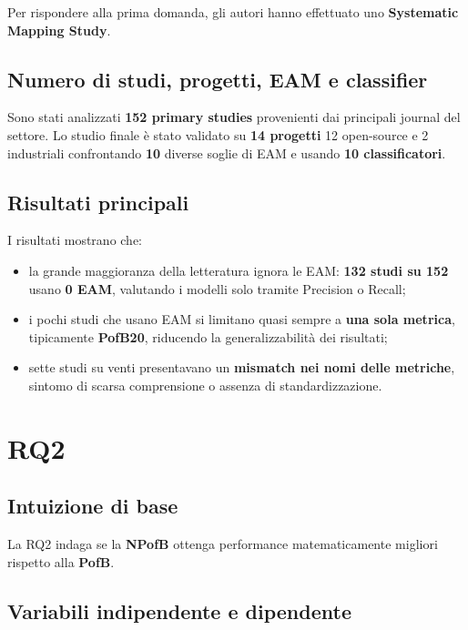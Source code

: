 Per rispondere alla prima domanda, gli autori hanno effettuato uno \textbf{Systematic Mapping Study}.

\subsection{Numero di studi, progetti, EAM e classifier}

Sono stati analizzati \textbf{152 primary studies} provenienti dai principali journal del settore. Lo studio finale è stato validato su \textbf{14 progetti} \textemdash{} 12 open-source e 2 industriali \textemdash{} confrontando \textbf{10} diverse soglie di EAM e usando \textbf{10 classificatori}.

\subsection{Risultati principali}

I risultati mostrano che:
\begin{itemize}
    \item la grande maggioranza della letteratura ignora le EAM: \textbf{132 studi su 152} usano \textbf{0 EAM}, valutando i modelli solo tramite Precision o Recall;
    \item i pochi studi che usano EAM si limitano quasi sempre a \textbf{una sola metrica}, tipicamente \textbf{PofB20}, riducendo la generalizzabilità dei risultati;
    \item sette studi su venti presentavano un \textbf{mismatch nei nomi delle metriche}, sintomo di scarsa comprensione o assenza di standardizzazione.
\end{itemize}

\section{RQ2}

\subsection{Intuizione di base}

La RQ2 indaga se la \textbf{NPofB} ottenga performance matematicamente migliori rispetto alla \textbf{PofB}.

\subsection{Variabili indipendente e dipendente}

